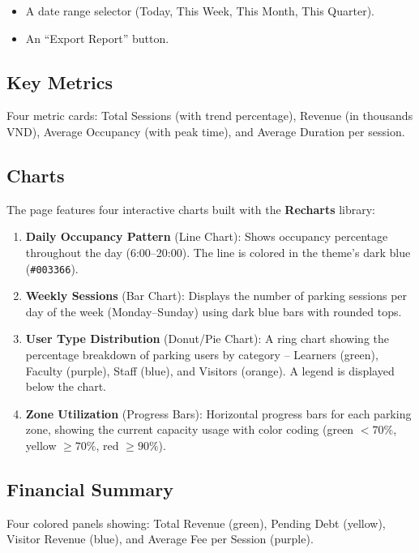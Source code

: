 \documentclass[12pt,a4paper]{article}
\begin{document}
\begin{itemize}
    \item A date range selector (Today, This Week, This Month, This Quarter).
    \item An ``Export Report'' button.
\end{itemize}

\subsection{Key Metrics}

Four metric cards: Total Sessions (with trend percentage), Revenue (in thousands VND), Average Occupancy (with peak time), and Average Duration per session.

\subsection{Charts}

The page features four interactive charts built with the \textbf{Recharts} library:

\begin{enumerate}
    \item \textbf{Daily Occupancy Pattern} (Line Chart): Shows occupancy percentage throughout the day (6:00--20:00). The line is colored in the theme's dark blue (\texttt{\#003366}).
    \item \textbf{Weekly Sessions} (Bar Chart): Displays the number of parking sessions per day of the week (Monday--Sunday) using dark blue bars with rounded tops.
    \item \textbf{User Type Distribution} (Donut/Pie Chart): A ring chart showing the percentage breakdown of parking users by category -- Learners (green), Faculty (purple), Staff (blue), and Visitors (orange). A legend is displayed below the chart.
    \item \textbf{Zone Utilization} (Progress Bars): Horizontal progress bars for each parking zone, showing the current capacity usage with color coding (green $<70\%$, yellow $\geq 70\%$, red $\geq 90\%$).
\end{enumerate}

\subsection{Financial Summary}

Four colored panels showing: Total Revenue (green), Pending Debt (yellow), Visitor Revenue (blue), and Average Fee per Session (purple).
\end{document}

